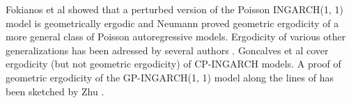 \documentclass{article}
\begin{document}
Fokianos et al \cite{Fokianos2009} showed that a perturbed version of the Poisson INGARCH(1, 1) model is geometrically ergodic and Neumann \cite[Theorem 3.1]{Neumann2011} proved geometric ergodicity of a more general class of Poisson autoregressive models. Ergodicity of various other generalizations has been adressed by several authors \citep{Davis2016, Douc2013, Neumann2011}. Goncalves et al \citep{Goncalves2015} cover ergodicity (but not geometric ergodicity) of CP-INGARCH models. A proof of geometric ergodicity of the GP-INGARCH(1, 1) model along the lines of \cite{Neumann2011} has been sketched by Zhu \citep{Zhu2012}. %
\end{document}
